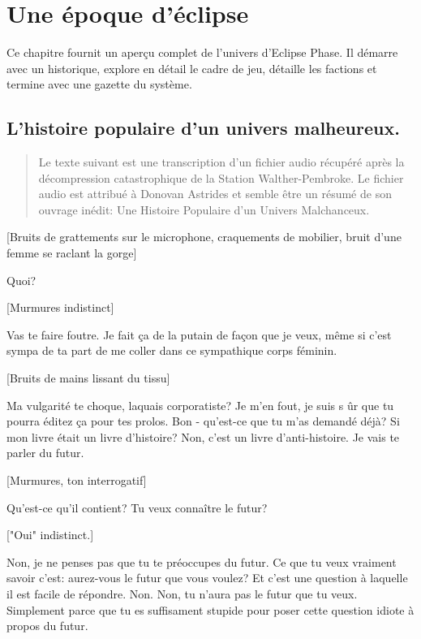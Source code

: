 \chapter{Une époque d'éclipse} \label{chap:a-time-of-eclipse} 

Ce chapitre fournit un aperçu complet de l'univers d'Eclipse Phase. Il démarre avec un historique, explore en détail le cadre de jeu, détaille les factions et termine avec une gazette du système. 

\section{L'histoire populaire d'un univers malheureux.} \label{sec:peoples-history-an} 

\begin{quotation}
   Le texte suivant est une transcription d'un fichier audio récupéré après la décompression catastrophique de la Station Walther-Pembroke. Le fichier audio est attribué à Donovan Astrides et semble être un résumé de son ouvrage inédit: Une Histoire Populaire d'un Univers Malchanceux.
\end{quotation} 

[Bruits de grattements sur le microphone, craquements de mobilier, bruit d'une femme se raclant la gorge] 

Quoi? 

[Murmures indistinct] 

Vas te faire foutre. Je fait ça de la putain de façon que je veux, même si c'est sympa de ta part de me coller dans ce sympathique corps féminin. 

[Bruits de mains lissant du tissu] 

Ma vulgarité te choque, laquais corporatiste? Je m'en fout, je suis s ûr que tu pourra éditez ça pour tes prolos. Bon - qu'est-ce que tu m'as demandé déjà? Si mon livre était un livre d'histoire? Non, c'est un livre d'anti-histoire. Je vais te parler du futur. 

[Murmures, ton interrogatif] 

Qu'est-ce qu'il contient? Tu veux connaître le futur? 

["Oui" indistinct.] 

Non, je ne penses pas que tu te préoccupes du futur. Ce que tu veux vraiment savoir c'est: aurez-vous le futur que vous voulez? Et c'est une question à laquelle il est facile de répondre. Non. Non, tu n'aura pas le futur que tu veux. Simplement parce que tu es suffisament stupide pour poser cette question idiote à propos du futur. 


